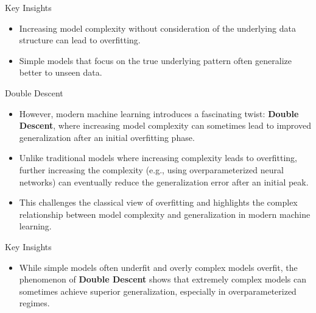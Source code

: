 \documentclass[
  ignorenonframetext,
]{beamer}
\providecommand{\tightlist}{%
  \setlength{\itemsep}{0pt}\setlength{\parskip}{0pt}}\usepackage{longtable,booktabs,array}
\begin{document}
\begin{frame}
\begin{block}{Key Insights}
\label{key-insights}
\begin{itemize}
\tightlist
\item
  Increasing model complexity without consideration of the underlying
  data structure can lead to overfitting.
\item
  Simple models that focus on the true underlying pattern often
  generalize better to unseen data.
\end{itemize}
\end{block}
\end{frame}

\begin{frame}{Double Descent}
\label{double-descent}
\begin{itemize}
\tightlist
\item
  However, modern machine learning introduces a fascinating twist:
  \textbf{Double Descent}, where increasing model complexity can
  sometimes lead to improved generalization after an initial overfitting
  phase.
\item
  Unlike traditional models where increasing complexity leads to
  overfitting, further increasing the complexity (e.g., using
  overparameterized neural networks) can eventually reduce the
  generalization error after an initial peak.
\item
  This challenges the classical view of overfitting and highlights the
  complex relationship between model complexity and generalization in
  modern machine learning.
\end{itemize}
\end{frame}

\begin{frame}
\begin{block}{Key Insights}
\label{key-insights-1}
\begin{itemize}
\tightlist
\item
  While simple models often underfit and overly complex models overfit,
  the phenomenon of \textbf{Double Descent} shows that extremely complex
  models can sometimes achieve superior generalization, especially in
  overparameterized regimes.
\end{itemize}
\end{block}
\end{frame}
\end{document}
